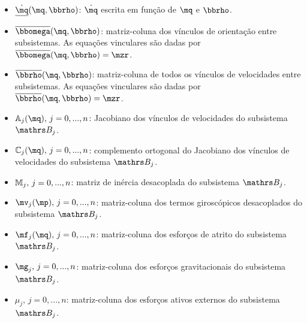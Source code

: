 \documentclass[a4paper,11pt,brazil,fleqn]{article}
\begin{document}
\begin{itemize}
\item $\underline{\dot{\mq}}(\mq,\mrho)$: $\dot{\mq}$ escrita em fun\c{c}\~ao de $\mq$ e $\mrho$.
\item $\overline{\momega}(\mq,\mrho)$: matriz-coluna dos v\'inculos de orienta\c{c}\~ao entre subsistemas. As equa\c{c}\~oes vinculares s\~ao dadas por $\overline{\momega}(\mq,\mrho) = \mzr $.
\item $\overline{\mrho}(\mq,\mrho)$: matriz-coluna de todos os v\'inculos de velocidades entre subsistemas. As equa\c{c}\~oes vinculares s\~ao dadas por $\overline{\mrho}(\mq,\mrho) = \mzr $.
\item $\mA_j(\mq), \,j=0, ..., n$: Jacobiano dos v\'inculos de velocidades do subsistema $\ssB_j$.
\item $\mC_j(\mq), \,j=0, ..., n$: complemento ortogonal do Jacobiano dos v\'inculos de velocidades do subsistema $\ssB_j$.
\item $\mathbb{M}_j, \,j=0, ..., n$: matriz de in\'ercia desacoplada do subsistema $\ssB_j$.
\item $\mv_j(\mp), \,j=0, ..., n$: matriz-coluna dos termos girosc\'opicos desacoplados do subsistema $\ssB_j$.
\item $\mf_j(\mq), \,j=0, ..., n$: matriz-coluna dos esfor\c{c}os de atrito do subsistema $\ssB_j$.
\item $\mg_j, \,j=0, ..., n$: matriz-coluna dos esfor\c{c}os gravitacionais do subsistema $\ssB_j$.
\item $\mu_j, \,j=0, ..., n$: matriz-coluna dos esfor\c{c}os ativos externos do subsistema $\ssB_j$.
\end{itemize}
\end{document}
